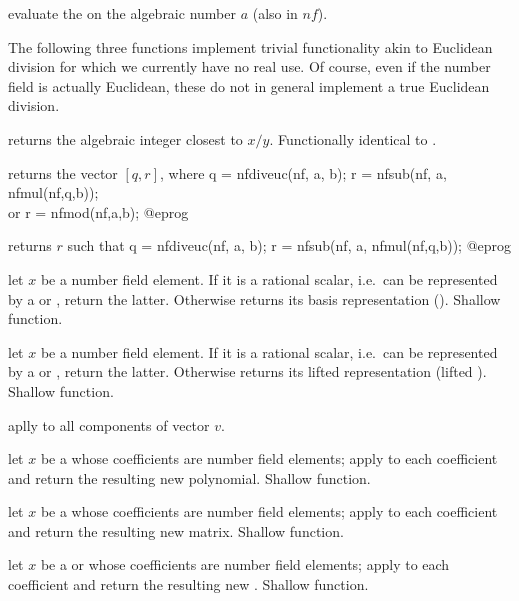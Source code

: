  evaluate the
  on the algebraic number $a$ (also in $nf$).

The following three functions implement trivial functionality akin to
Euclidean division for which we currently have no real use. Of course, even if
the number field is actually Euclidean, these do not in general implement a
true Euclidean division.

 returns the algebraic integer
closest to $x / y$. Functionally identical to .

 returns the vector $[q,r]$, where
\bprog
  q = nfdiveuc(nf, a, b);
  r = nfsub(nf, a, nfmul(nf,q,b));    \\ or r = nfmod(nf,a,b);
@eprog

 returns $r$ such that
\bprog
  q = nfdiveuc(nf, a, b);
  r = nfsub(nf, a, nfmul(nf,q,b));
@eprog

 let $x$ be a number field
element. If it is a rational scalar, i.e.~can be represented by a 
or , return the latter. Otherwise returns its basis representation
(). Shallow function.

 let $x$ be a number field
element. If it is a rational scalar, i.e.~can be represented by a 
or , return the latter. Otherwise returns its lifted 
representation (lifted ). Shallow function.

 aplly 
to all components of vector $v$.

 let $x$ be a  whose coefficients
are number field elements; apply  to each
coefficient and return the resulting new polynomial. Shallow function.

 let $x$ be a  whose coefficients
are number field elements; apply  to each
coefficient and return the resulting new matrix. Shallow function.

 let $x$ be a  or
 whose coefficients
are number field elements; apply  to each
coefficient and return the resulting new . Shallow function.

